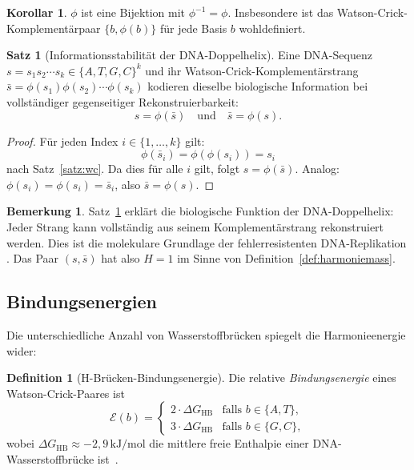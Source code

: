 ﻿\documentclass[a4paper,12pt]{article}
\theoremstyle{definition}
\newtheorem{definition}{Definition}
\newtheorem{satz}{Satz}
\newtheorem{bemerkung}{Bemerkung}
\newtheorem{korollar}{Korollar}
\begin{document}
\begin{korollar}
	$\phi$ ist eine Bijektion mit $\phi^{-1} = \phi$. Insbesondere ist das
	Watson-Crick-Komplementärpaar $\{b, \phi(b)\}$ für jede Basis $b$ wohldefiniert.
\end{korollar}

\begin{satz}[Informationsstabilität der DNA-Doppelhelix]
	\label{satz:dna_info}
	Eine DNA-Sequenz $s = s_1 s_2 \cdots s_k \in \{A,T,G,C\}^k$ und ihr
	Watson-Crick-Komplementärstrang $\bar{s} = \phi(s_1)\phi(s_2)\cdots\phi(s_k)$
	kodieren dieselbe biologische Information bei vollständiger gegenseitiger
	Rekonstruierbarkeit:
	\[
		s = \phi(\bar{s}) \quad \text{und} \quad \bar{s} = \phi(s).
	\]
\end{satz}

\begin{proof}
	Für jeden Index $i \in \{1,\ldots,k\}$ gilt:
	\[
		\phi(\bar{s}_i) = \phi(\phi(s_i)) = s_i
	\]
	nach Satz~\ref{satz:wc}. Da dies für alle $i$ gilt, folgt $s = \phi(\bar{s})$.
	Analog: $\phi(s_i) = \phi(s_i) = \bar{s}_i$, also $\bar{s} = \phi(s)$. \qedhere
\end{proof}

\begin{bemerkung}
	Satz~\ref{satz:dna_info} erklärt die biologische Funktion der DNA-Doppelhelix:
	Jeder Strang kann vollständig aus seinem Komplementärstrang rekonstruiert werden.
	Dies ist die molekulare Grundlage der fehlerresistenten DNA-Replikation \cite{alberts2015}.
	Das Paar $(s, \bar{s})$ hat also $H = 1$ im Sinne von Definition~\ref{def:harmoniemass}.
\end{bemerkung}

\subsection{Bindungsenergien}

Die unterschiedliche Anzahl von Wasserstoffbrücken spiegelt die Harmonieenergie wider:

\begin{definition}[H-Brücken-Bindungsenergie]
	Die relative \emph{Bindungsenergie} eines Watson-Crick-Paares ist
	\[
		\mathcal{E}(b) =
		\begin{cases}
			2 \cdot \Delta G_{\mathrm{HB}} & \text{falls } b \in \{A,T\}, \\
			3 \cdot \Delta G_{\mathrm{HB}} & \text{falls } b \in \{G,C\},
		\end{cases}
	\]
	wobei $\Delta G_{\mathrm{HB}} \approx -2{,}9\,\mathrm{kJ/mol}$ die mittlere
	freie Enthalpie einer DNA-Wasserstoffbrücke ist~\cite{lehninger2017}.
\end{definition}
\end{document}
